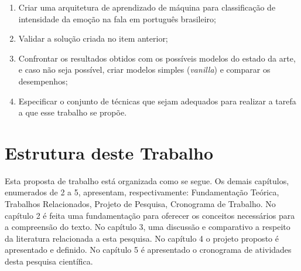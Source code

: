 \begin{enumerate}
    \item Criar uma arquitetura de aprendizado de máquina para classificação de intensidade da emoção na fala em português brasileiro;
    \item Validar a solução criada no item anterior;
    \item Confrontar os resultados obtidos com os possíveis modelos do estado da arte, e caso não seja possível, criar modelos simples (\textit{vanilla}) e comparar os desempenhos;
    \item Especificar o conjunto de técnicas que sejam adequados para realizar a tarefa a que esse trabalho se propõe.
\end{enumerate}

\section{Estrutura deste Trabalho}

Esta proposta de trabalho está organizada como se segue. Os demais capítulos, enumerados de 2 a 5, apresentam, respectivamente: Fundamentação Teórica, Trabalhos Relacionados, Projeto de Pesquisa, Cronograma de Trabalho. No capítulo 2 é feita uma fundamentação para oferecer os conceitos necessários para a compreensão do texto. No capítulo 3, uma discussão e comparativo a respeito da literatura relacionada a esta pesquisa. No capítulo 4 o projeto proposto é apresentado e definido. No capítulo 5 é apresentado o cronograma de atividades desta pesquisa científica.
